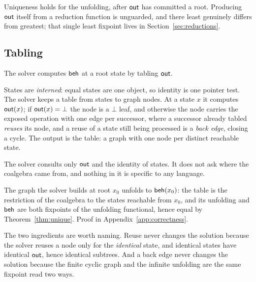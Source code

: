 \begin{remark}\label{rem:leastessential}
  Uniqueness holds for the unfolding, after $\mathsf{out}$ has committed a root. Producing $\mathsf{out}$
  itself from a reduction function is unguarded, and there least genuinely differs from
  greatest; that single least fixpoint lives in Section~\ref{sec:reductions}.
\end{remark}

\subsection{Tabling}\label{sec:tabling}

The solver computes $\mathsf{beh}$ at a root state by tabling $\mathsf{out}$.

\begin{definition}\label{def:solver}
  States are \emph{interned}: equal states are one object, so identity is one pointer test.
  The solver keeps a table from states to graph nodes. At a state $x$ it computes $\mathsf{out}(x)$;
  if $\mathsf{out}(x) = \bot$ the node is a $\bot$ leaf, and otherwise the node carries the exposed
  operation with one edge per successor, where a successor already tabled \emph{reuses} its
  node, and a reuse of a state still being processed is a \emph{back edge}, closing a cycle.
  The output is the table: a graph with one node per distinct reachable state.
\end{definition}

The solver consults only $\mathsf{out}$ and the identity of states. It does not ask where the
coalgebra came from, and nothing in it is specific to any language.

\begin{theorem}[Soundness]\label{thm:correctness}
  The graph the solver builds at root $x_0$ unfolds to $\mathsf{beh}(x_0)$: the table is the
  restriction of the coalgebra to the states reachable from $x_0$, and its unfolding and
  $\mathsf{beh}$ are both fixpoints of the unfolding functional, hence equal by
  Theorem~\ref{thm:unique}. Proof in Appendix~\ref{app:correctness}.
\end{theorem}

\noindent
The two ingredients are worth naming. Reuse never changes the solution because the solver
reuses a node only for the \emph{identical} state, and identical states have identical
$\mathsf{out}$, hence identical subtrees. And a back edge never changes the solution because the
finite cyclic graph and the infinite unfolding are the same fixpoint read two ways.

